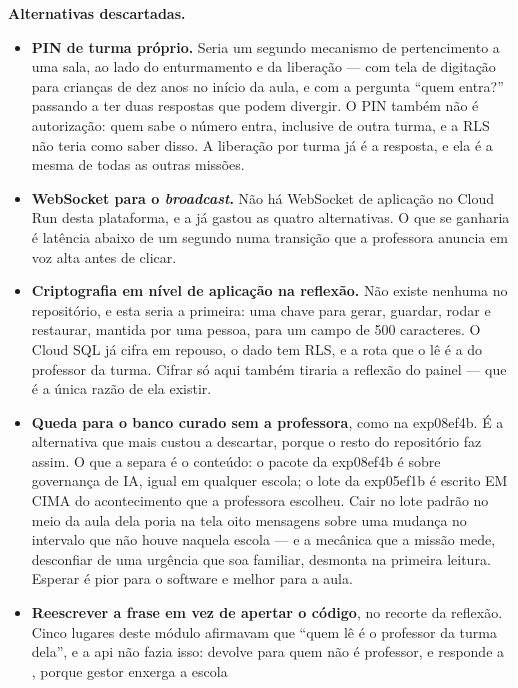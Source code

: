 \textbf{Alternativas descartadas.}

\begin{itemize}
  \item \textbf{PIN de turma próprio.} Seria um segundo mecanismo de
    pertencimento a uma sala, ao lado do enturmamento e da liberação --- com
    tela de digitação para crianças de dez anos no início da aula, e com a
    pergunta \enquote{quem entra?} passando a ter duas respostas que podem
    divergir. O PIN também não é autorização: quem sabe o número entra, inclusive
    de outra turma, e a RLS não teria como saber disso. A liberação por turma já
    é a resposta, e ela é a mesma de todas as outras missões.
  \item \textbf{WebSocket para o \emph{broadcast}.} Não há WebSocket de aplicação
    no Cloud Run desta plataforma, e a  já gastou as quatro
    alternativas. O que se ganharia é latência abaixo de um segundo numa transição
    que a professora anuncia em voz alta antes de clicar.
  \item \textbf{Criptografia em nível de aplicação na reflexão.} Não existe
    nenhuma no repositório, e esta seria a primeira: uma chave para gerar,
    guardar, rodar e restaurar, mantida por uma pessoa, para um campo de 500
    caracteres. O Cloud SQL já cifra em repouso, o dado tem RLS, e a rota que o
    lê é a do professor da turma. Cifrar só aqui também tiraria a reflexão do
    painel --- que é a única razão de ela existir.
  \item \textbf{Queda para o banco curado sem a professora}, como na exp08ef4b. É a
    alternativa que mais custou a descartar, porque o resto do repositório faz
    assim. O que a separa é o conteúdo: o pacote da exp08ef4b é sobre governança de
    IA, igual em qualquer escola; o lote da exp05ef1b é escrito EM CIMA do
    acontecimento que a professora escolheu. Cair no lote padrão no meio da aula
    dela poria na tela oito mensagens sobre uma mudança no intervalo que não
    houve naquela escola --- e a mecânica que a missão mede, desconfiar de uma
    urgência que soa familiar, desmonta na primeira leitura. Esperar é pior para
    o software e melhor para a aula.
  \item \textbf{Reescrever a frase em vez de apertar o código}, no recorte da
    reflexão. Cinco lugares deste módulo afirmavam que \enquote{quem lê é o
    professor da turma dela}, e a api não fazia isso: 
    devolve  para quem não é professor, e 
    responde  a , porque gestor enxerga a escola

\end{itemize}
